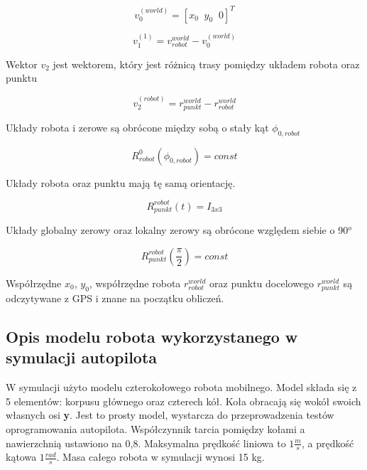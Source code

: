 {{        \begin{equation}
            v_0^{(world)}=[x_{0} \;\; y_{0} \;\; 0]^T
        \end{equation}
        
        \begin{equation}
            v_1^{(1)}=v_{robot}^{world} - v_0^{(world)}
        \end{equation}
        
        Wektor $v_2$ jest wektorem, który jest różnicą trasy pomiędzy układem robota oraz punktu
        
        \begin{equation}
            v_2^{(robot)}=r_{punkt}^{world} - r_{robot}^{world}
        \end{equation}
        
        Układy robota i zerowe są obrócone między sobą o stały kąt $\phi_{0,robot}$
        
        \begin{equation}
            R^{0}_{robot}(\phi_{0,robot}) = const
        \end{equation}
        
        Układy robota oraz punktu mają tę samą orientację.
        
        \begin{equation}
            R^{robot}_{punkt}(t) = I_{3x3}
        \end{equation}
        
        Układy globalny zerowy oraz lokalny zerowy są obrócone względem siebie o 90$^o$
        
        \begin{equation}
            R^{robot}_{punkt}(\frac{\pi}{2}) = const
        \end{equation}
        
        Współrzędne $x_{0}$, $y_{0}$, współrzędne robota $r_{robot}^{world}$  oraz punktu docelowego $r_{punkt}^{world}$ są odczytywane z GPS i znane na początku obliczeń.
    }
    \subsection{Opis modelu robota wykorzystanego w symulacji autopilota}
    {
        W symulacji użyto modelu czterokołowego robota mobilnego. Model składa się z 5 elementów: korpusu głównego oraz czterech kół. Koła obracają się wokół swoich własnych osi \textbf{y}. Jest to prosty model,  wystarcza do przeprowadzenia testów oprogramowania autopilota. Współczynnik tarcia pomiędzy kołami a nawierzchnią ustawiono na 0,8. Maksymalna prędkość liniowa to $1 \frac{m}{s}$, a prędkość kątowa $1 \frac{rad}{s}$. Masa całego robota w symulacji wynosi 15 kg.
    }
}